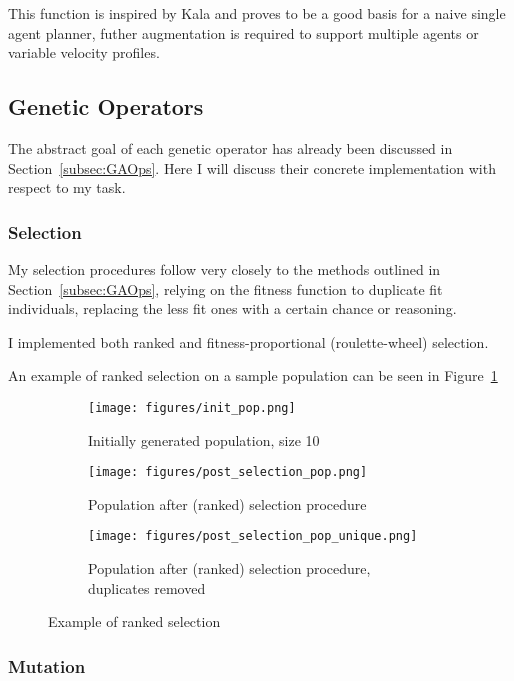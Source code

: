 This function is inspired by Kala\cite{kalaOptimizationBasedPlanning2016} and proves to be a good basis for a naive single agent planner, futher augmentation is required to support multiple agents or variable velocity profiles.


\subsection{Genetic Operators}

The abstract goal of each genetic operator has already been discussed in Section~\ref{subsec:GAOps}. Here I will discuss their concrete implementation with respect to my task.

\subsubsection{Selection}
\label{subsec:approach:selection}

My selection procedures follow very closely to the methods outlined in Section~\ref{subsec:GAOps}, relying on the fitness function to duplicate fit individuals, replacing the less fit ones with a certain chance or reasoning.

I implemented both ranked and fitness-proportional (roulette-wheel) selection.

An example of ranked selection on a sample population can be seen in Figure~\ref{fig:selection_eg}

\begin{figure}
  \centering
  \begin{subfigure}[b]{0.44\textwidth}
    \centering
    \texttt{[image: figures/init\_pop.png]}
    \caption{Initially generated population, size 10}
  \end{subfigure}
  \begin{subfigure}[b]{0.44\textwidth}
    \centering
    \texttt{[image: figures/post\_selection\_pop.png]}
    \caption{Population after (ranked) selection procedure}
  \end{subfigure}
  \begin{subfigure}[b]{0.44\textwidth}
    \centering
    \texttt{[image: figures/post\_selection\_pop\_unique.png]}
    \caption{Population after (ranked) selection procedure, duplicates removed}
  \end{subfigure}
  \caption{\label{fig:selection_eg} Example of ranked selection}
\end{figure}


\subsubsection{Mutation}

